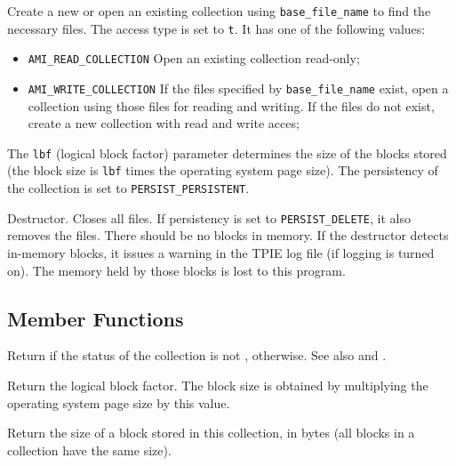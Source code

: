          {Create a new or open an 
        existing collection using {\tt base\_file\_name} to find the
        necessary files. The access type is set to {\tt t}. It has one of
        the following values:
        \begin{itemize} 
          \item[]{\tt AMI\_READ\_COLLECTION} Open an existing collection
          read-only;
          \item[]{\tt AMI\_WRITE\_COLLECTION} If the files specified by
          {\tt base\_file\_name} exist, open a collection using those files
          for reading and writing. If the files do not exist, create a new
          collection with read and write acces;
        \end{itemize}
        The {\tt lbf} (logical block factor) parameter determines the size
        of the blocks stored (the block size is {\tt lbf} times the
        operating system page size). The persistency of the collection is
        set to {\tt PERSIST\_PERSISTENT}.}

       {Destructor.
      Closes all files. If persistency is set to {\tt PERSIST\_DELETE}, it
      also removes the files. There should be no blocks in memory. If the
      destructor detects in-memory blocks, it issues a warning in the TPIE
      log file (if logging is turned on). The memory held by those blocks
      is lost to this program.}

   \etabb

\subsection{Member Functions}

   \btabb

         {Return  if
        the status of the collection is not
        , 
        otherwise. See also  and .}

         {Return the logical
        block factor. The block size is obtained by multiplying the
        operating system page size by this value.}

         {Return the size of a block
        stored in this collection, in bytes (all blocks in a collection
        have the same size).}


